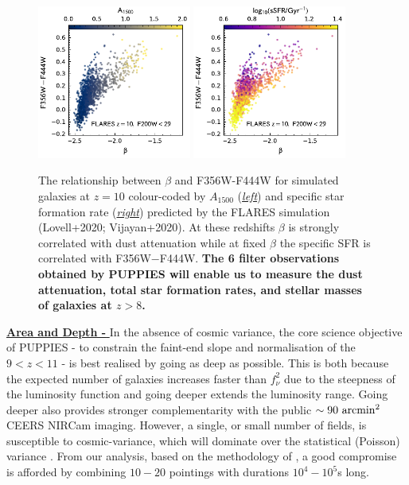 \documentclass[12pt]{article}
\begin{document}
\begin{figure}[h!]
    \centering
    \includegraphics[width=0.45\textwidth]{figs/beta_A1500.pdf}
    \includegraphics[width=0.45\textwidth]{figs/beta_sSFR.pdf}
    \caption{The relationship between $\beta$ and F356W-F444W for simulated galaxies at $z=10$ colour-coded by $A_{1500}$ (\emph{\underline{left}}) and specific star formation rate (\emph{\underline{right}}) predicted by the FLARES simulation (Lovell+2020; Vijayan+2020). At these redshifts $\beta$ is strongly correlated with dust attenuation while at fixed $\beta$ the specific SFR is correlated with F356W$-$F444W. \textbf{The 6 filter observations obtained by PUPPIES will enable us to measure the dust attenuation, total star formation rates, and stellar masses of galaxies at $z>8$.}}
    \label{fig:beta}
\end{figure}

\vspace{5mm}
\noindent
\underline{\bf Area and Depth - } In the absence of cosmic variance, the core science objective of PUPPIES - to constrain the faint-end slope and normalisation of the $9<z<11$ - is best realised by going as deep as possible. This is both because the expected number of galaxies increases faster than $f_{\nu}^2$ due to the steepness of the luminosity function and going deeper extends the luminosity range. Going deeper also provides stronger complementarity with the public $\sim 90\ {\rm arcmin}^2$ CEERS NIRCam imaging. However, a single, or small number of fields, is susceptible to cosmic-variance, which will dominate over the statistical (Poisson) variance \citep[e.g][]{2020MNRAS.499.2401T}. From our analysis, based on the methodology of \citet{2020MNRAS.499.2401T}, a good compromise is afforded by combining $10-20$ pointings with durations $10^4-10^5$s long. 
\end{document}
